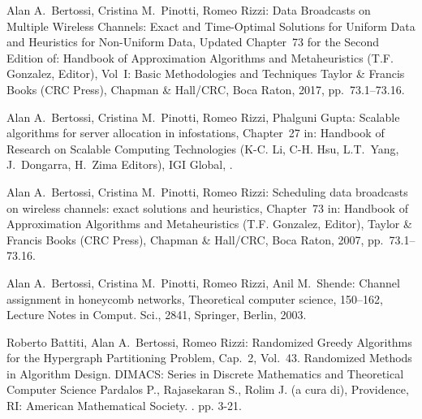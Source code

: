 
\begin{etaremune}
\vspace{-3.0mm}

  \item {\sc Alan A.~Bertossi, Cristina M.~Pinotti, Romeo Rizzi:}
   \newblock  Data Broadcasts on Multiple Wireless Channels:
Exact and Time-Optimal Solutions for Uniform Data
and Heuristics for Non-Uniform Data,
   \newblock  Updated Chapter~73 for the Second Edition of:
               Handbook of Approximation Algorithms and Metaheuristics
   \newblock (T.F. Gonzalez, Editor),
   \newblock Vol~I: Basic Methodologies and Techniques
   \newblock  Taylor \& Francis Books (CRC Press),
   \newblock Chapman \& Hall/CRC, Boca Raton, 2017, pp.~73.1--73.16.

  \item {\sc Alan A.~Bertossi, Cristina M.~Pinotti, Romeo Rizzi, Phalguni Gupta:}
   \newblock  Scalable algorithms for server allocation in infostations,
   \newblock  Chapter~27 in:
               Handbook of Research on Scalable Computing Technologies
   \newblock (K-C. Li, C-H. Hsu, L.T.~Yang, J.~Dongarra, H.~Zima Editors),
   \newblock  IGI Global,
   .

  \item {\sc Alan A.~Bertossi, Cristina M.~Pinotti, Romeo Rizzi:}
   \newblock  Scheduling data broadcasts on wireless channels:
               exact solutions and heuristics,
   \newblock  Chapter~73 in:
               Handbook of Approximation Algorithms and Metaheuristics
   \newblock (T.F. Gonzalez, Editor),
   \newblock  Taylor \& Francis Books (CRC Press),
   \newblock Chapman \& Hall/CRC, Boca Raton, 2007, pp.~73.1--73.16.

  \item {\sc Alan A.~Bertossi, Cristina M.~Pinotti, Romeo Rizzi, Anil M.~Shende:}
   \newblock  Channel assignment in honeycomb networks,
   \newblock Theoretical computer science,  150--162,
   \newblock Lecture Notes in Comput. Sci., 2841,
   \newblock Springer, Berlin, 2003.

  \item {\sc Roberto Battiti, Alan A.~Bertossi, Romeo Rizzi:}  
   \newblock  Randomized Greedy Algorithms 
              for the Hypergraph Partitioning Problem,
   \newblock Cap.~2, Vol.~43.
   \newblock Randomized Methods in Algorithm Design.
   \newblock DIMACS: Series in Discrete Mathematics
             and Theoretical Computer Science
   \newblock Pardalos P., Rajasekaran S., Rolim J. (a cura di),
             Providence, RI: American Mathematical Society.
   . pp. 3-21.

\end{etaremune}
